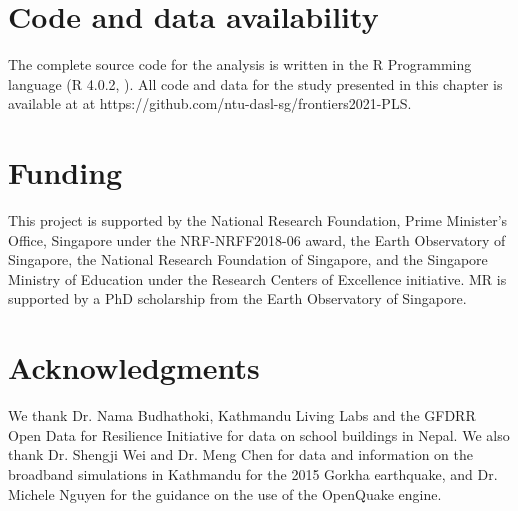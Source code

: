 \section{Code and data availability}
The complete source code for the analysis is written in the R Programming language  (R 4.0.2, \cite{team2013r}). All code and data for the study presented in this chapter is available at at https://github.com/ntu-dasl-sg/frontiers2021-PLS. 

\section{Funding}
This project is supported by the National Research Foundation, Prime Minister’s Office, Singapore under the NRF-NRFF2018-06 award, the Earth Observatory of Singapore, the National Research Foundation of Singapore, and the Singapore Ministry of Education under the Research Centers of Excellence initiative. MR is supported by a PhD scholarship from the Earth Observatory of Singapore.

\section{Acknowledgments}
We thank Dr. Nama Budhathoki, Kathmandu Living Labs and the GFDRR Open Data for Resilience Initiative for data on school buildings in Nepal. We also thank Dr. Shengji Wei and Dr. Meng Chen for data and information on the broadband simulations in Kathmandu for the 2015 Gorkha earthquake, and Dr. Michele Nguyen for the guidance on the use of the OpenQuake engine.
